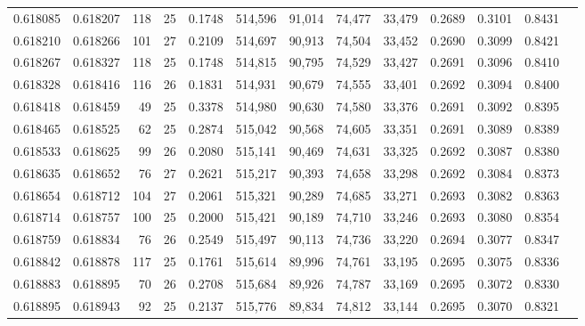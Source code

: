 \begin{tabular}{rrrrrrrrrrrrr}
0.618085 & 0.618207 & 118 &  25 &                                     0.1748 & 514,596 &  91,014 &  74,477 &  33,479 & 0.2689 & 0.3101 & 0.8431 \\
0.618210 & 0.618266 & 101 &  27 &                                     0.2109 & 514,697 &  90,913 &  74,504 &  33,452 & 0.2690 & 0.3099 & 0.8421 \\
0.618267 & 0.618327 & 118 &  25 &                                     0.1748 & 514,815 &  90,795 &  74,529 &  33,427 & 0.2691 & 0.3096 & 0.8410 \\
0.618328 & 0.618416 & 116 &  26 &                                     0.1831 & 514,931 &  90,679 &  74,555 &  33,401 & 0.2692 & 0.3094 & 0.8400 \\
0.618418 & 0.618459 &  49 &  25 &                                     0.3378 & 514,980 &  90,630 &  74,580 &  33,376 & 0.2691 & 0.3092 & 0.8395 \\
0.618465 & 0.618525 &  62 &  25 &                                     0.2874 & 515,042 &  90,568 &  74,605 &  33,351 & 0.2691 & 0.3089 & 0.8389 \\
0.618533 & 0.618625 &  99 &  26 &                                     0.2080 & 515,141 &  90,469 &  74,631 &  33,325 & 0.2692 & 0.3087 & 0.8380 \\
0.618635 & 0.618652 &  76 &  27 &                                     0.2621 & 515,217 &  90,393 &  74,658 &  33,298 & 0.2692 & 0.3084 & 0.8373 \\
0.618654 & 0.618712 & 104 &  27 &                                     0.2061 & 515,321 &  90,289 &  74,685 &  33,271 & 0.2693 & 0.3082 & 0.8363 \\
0.618714 & 0.618757 & 100 &  25 &                                     0.2000 & 515,421 &  90,189 &  74,710 &  33,246 & 0.2693 & 0.3080 & 0.8354 \\
0.618759 & 0.618834 &  76 &  26 &                                     0.2549 & 515,497 &  90,113 &  74,736 &  33,220 & 0.2694 & 0.3077 & 0.8347 \\
0.618842 & 0.618878 & 117 &  25 &                                     0.1761 & 515,614 &  89,996 &  74,761 &  33,195 & 0.2695 & 0.3075 & 0.8336 \\
0.618883 & 0.618895 &  70 &  26 &                                     0.2708 & 515,684 &  89,926 &  74,787 &  33,169 & 0.2695 & 0.3072 & 0.8330 \\
0.618895 & 0.618943 &  92 &  25 &                                     0.2137 & 515,776 &  89,834 &  74,812 &  33,144 & 0.2695 & 0.3070 & 0.8321 \\

\end{tabular}
